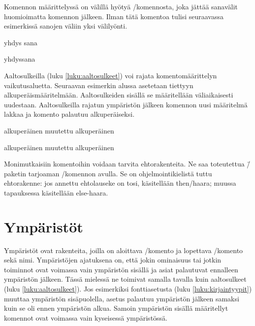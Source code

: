 Komennon määrittelyssä on välillä hyötyä \-/komennosta, joka jättää sanavälit huomioimatta
komennon jälkeen. Ilman tätä komentoa tulisi seuraavassa esimerkissä
sanojen väliin yksi välilyönti.


\begin{koodilohkosis}
  \newcommand{\komento}[1]{#1\ignorespaces}
  \komento{yhdys}       sana
\end{koodilohkosis}

\begin{tulossis}
  yhdyssana
\end{tulossis}

Aaltosulkeilla (luku \ref{luku:aaltosulkeet}) voi rajata
komentomäärittelyn vai\-ku\-tus\-aluet\-ta. Seuraavan esimerkin alussa
asetetaan  tiettyyn alkuperäismääritelmään.
Aaltosulkeiden sisällä se määritellään väliaikaisesti uudestaan.
Aaltosulkeilla rajatun ympäristön jälkeen komennon uusi määritelmä
lakkaa ja komento palautuu alkuperäiseksi.


\begin{koodilohkosis}
  \newcommand{\komento}{alkuperäinen}
  \komento
  {%
    \renewcommand{\komento}{muutettu}
    \komento
  }
  \komento
\end{koodilohkosis}

\begin{tulossis}
  alkuperäinen muutettu alkuperäinen
\end{tulossis}

Monimutkaisiin komentoihin voidaan tarvita ehtorakenteita. Ne saa
toteutettua \=/paketin tarjoaman
\-/komennon avulla. Se on
ohjelmointikielistä tuttu ehtorakenne: jos annettu ehtolauseke on tosi,
käsitellään then\-/haara; muussa tapauksessa käsitellään else-haara.

\section{Ympäristöt}
\label{luku:ymparistot}

Ympäristöt ovat rakenteita, joilla on aloittava \-/komento ja lopettava \-/komento sekä nimi.
Ympäristöjen ajatuksena on, että jokin ominaisuus tai jotkin toiminnot
ovat voimassa vain ympäristön sisällä ja asiat palautuvat ennalleen
ympäristön jälkeen. Tässä mielessä ne toimivat samalla tavalla kuin
aaltosulkeet (luku \ref{luku:aaltosulkeet}). Jos esimerkiksi
fonttiasetusta (luku \ref{luku:kirjaintyypit}) muuttaa ympäristön
sisäpuolella, asetus palautuu ympäristön jälkeen samaksi kuin se oli
ennen ympäristön alkua. Samoin ympäristön sisällä määritellyt komennot
ovat voimassa vain kyseisessä ympäristössä.

